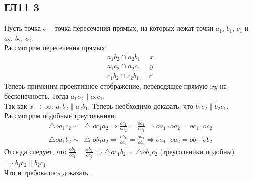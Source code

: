 \subsection*{ГЛ11 3}
Пусть точка $o$ -- точка пересечения прямых, на которых лежат точки $a_1$, $b_1$, $c_1$ и $a_2$, $b_2$, $c_2$.\\		
Рассмотрим пересечения прямых:\\		
\begin{gather*}
	a_1b_2\cap a_2b_1=x\\		
	a_1c_2\cap a_2c_1=y\\		
	c_1b_2\cap c_2b_1=z	
\end{gather*}
Теперь применим проективное отображение, переводящее прямую $xy$ на бесконечность. Тогда $a_1c_2\parallel a_2c_1$.\\		
Так как $x \to \infty:\ a_1b_2\parallel a_2b_1$. Теперь необходимо доказать, что $b_1c_2\parallel b_2c_1$.\\		
Рассмотрим подобные треугольники.
\begin{gather*}
	\bigtriangleup oa_1c_2\sim \ \bigtriangleup oc_1a_2 \Rightarrow \frac{oc_1}{oa_2}=\frac{oa_1}{oc_2} \Rightarrow oa_1\cdot oa_2=oc_1\cdot oc_2\\		
	\bigtriangleup oa_1b_2\sim \ \bigtriangleup ob_1a_2 \Rightarrow \frac{ob_1}{oa_2}=\frac{oa_1}{ob_2} \Rightarrow oa_1\cdot oa_2=ob_1\cdot ob_2
\end{gather*}
Отсюда следует, что $\frac{ob_1}{oc_1}=\frac{ob_2}{oc_2} \Rightarrow \bigtriangleup oc_1b_2\sim \bigtriangleup ob_1c_2$ (треугольники подобны) $\Rightarrow b_1c_2\parallel b_2c_1$.\\		
	Что и требовалось доказать.
		